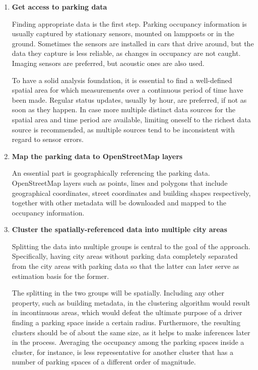 \documentclass{ws-ijait}
\begin{document}
	\begin{enumerate}[label=\Roman*]
				
		\item{\textbf{Get access to parking data}}
		
		Finding appropriate data is the first step. Parking occupancy information is usually captured by stationary sensors, mounted on lampposts or in the ground. Sometimes the sensors are installed in cars that drive around, but the data they capture is less reliable, as changes in occupancy are not caught. Imaging sensors are preferred, but acoustic ones are also used.
		
		To have a solid analysis foundation, it is essential to find a well-defined spatial area for which measurements over a continuous period of time have been made. Regular status updates, usually by hour, are preferred, if not as soon as they happen. In case more multiple distinct data sources for the spatial area and time period are available, limiting oneself to the richest data source is recommended, as multiple sources tend to be inconsistent with regard to sensor errors.
		
		
		\item{\textbf{Map the parking data to OpenStreetMap layers}}
		
		An essential part is geographically referencing the parking data. OpenStreetMap layers such as points, lines and polygons that include geographical coordinates, street coordinates and building shapes respectively, together with other metadata will be downloaded and mapped to the occupancy information.
		
		\item{\textbf{Cluster the spatially-referenced data into multiple city areas}}
		
		Splitting the data into multiple groups is central to the goal of the approach. Specifically, having city areas without parking data completely separated from the city areas with parking data so that the latter can later serve as estimation basis for the former. 
		
		The splitting in the two groups will be spatially. Including any other property, such as building metadata, in the clustering algorithm would result in incontinuous areas, which would defeat the ultimate purpose of a driver finding a parking space inside a certain radius. Furthermore, the resulting clusters should be of about the same size, as it helps to make inferences later in the process. Averaging the occupancy among the parking spaces inside a cluster, for instance, is less representative for another cluster that has a number of parking spaces of a different order of magnitude.		
		

\end{enumerate}
\end{document}
